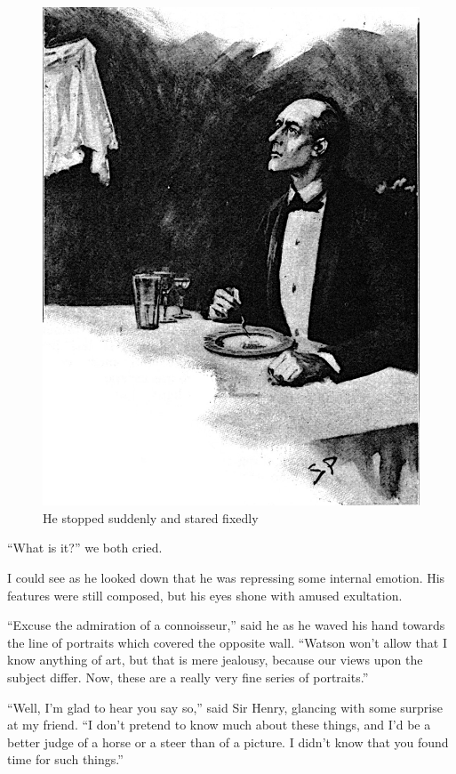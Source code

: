 \documentclass[paper=5.5in:8.5in,BCOR=7mm,twoside,DIV=calc,12pt,usegeometry,openany,chapterprefix,endperiod]{scrbook} %
\begin{document}
\begin{figure}[tbph]
\centering
\includegraphics[width=\linewidth]{13_stopstare}
\caption{He stopped suddenly and stared fixedly}
\end{figure}

\enquote{What is it?} we both cried.

I could see as he looked down that he was repressing some internal emotion. His features were still composed, but his eyes shone with amused exultation.

\enquote{Excuse the admiration of a connoisseur,} said he as he waved his hand towards the line of portraits which covered the opposite wall. \enquote{Watson won't allow that I know anything of art, but that is mere jealousy, because our views upon the subject differ. Now, these are a really very fine series of portraits.}

\enquote{Well, I'm glad to hear you say so,} said Sir Henry, glancing with some surprise at my friend. \enquote{I don't pretend to know much about these things, and I'd be a better judge of a horse or a steer than of a picture. I didn't know that you found time for such things.}
\end{document}
